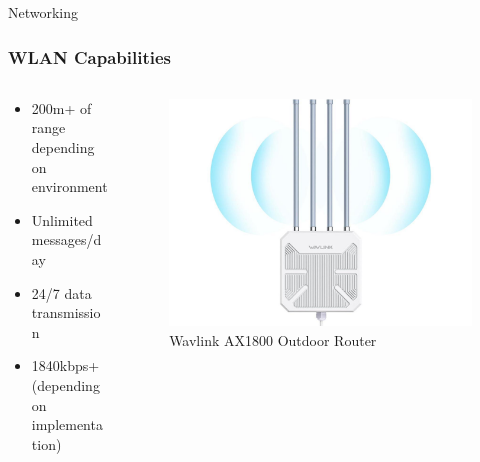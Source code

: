 \documentclass{beamer}
\begin{document}
  \begin{frame}{Networking}
    \frametitle{WLAN Capabilities}
    \begin{columns}
      \begin{column}{0.5\textwidth}
        \begin{itemize}
          \item 200m+ of range depending on environment
          \item Unlimited messages/day
          \item 24/7 data transmission
          \item 1840kbps+ (depending on implementation)
        \end{itemize}
      \end{column}
      \begin{column}{0.5\textwidth}
        \begin{figure}[htbp]
          \centering
          \includegraphics[width=\textwidth]{wav_link_outdoor_router.jpg}
          \caption{Wavlink AX1800 Outdoor Router}
          \label{fig:WildFi_infrastructure_overview}
        \end{figure}
      \end{column}
    \end{columns}
  \end{frame}
\end{document}
